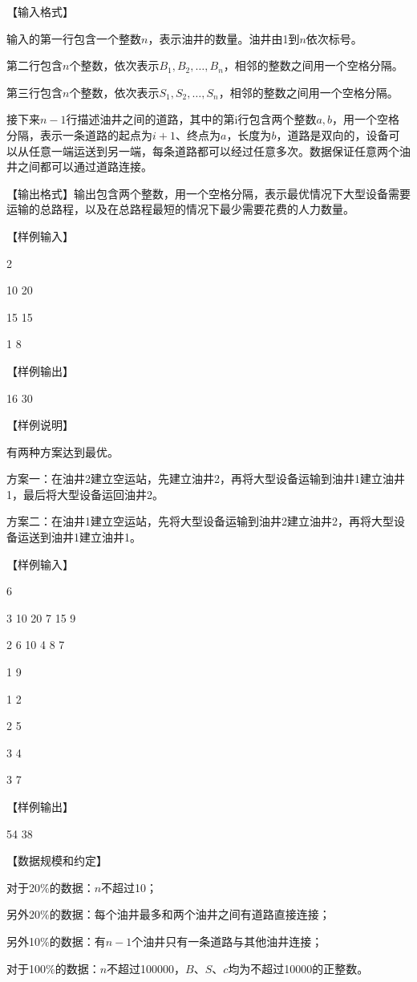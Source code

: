 \documentclass[a4paper, 12pt, twocolumn]{ctexart}
\begin{document}
	【输入格式】
	
	输入的第一行包含一个整数$n$，表示油井的数量。油井由1到$n$依次标号。
	
	第二行包含$n$个整数，依次表示$B_1, B_2, …, B_n$，相邻的整数之间用一个空格分隔。
	
	第三行包含$n$个整数，依次表示$S_1, S_2, …, S_n$，相邻的整数之间用一个空格分隔。
	
	接下来$n-1$行描述油井之间的道路，其中的第i行包含两个整数$a,b$，用一个空格分隔，表示一条道路的起点为$i+1$、终点为$a$，长度为$b$，道路是双向的，设备可以从任意一端运送到另一端，每条道路都可以经过任意多次。数据保证任意两个油井之间都可以通过道路连接。
	
	【输出格式】输出包含两个整数，用一个空格分隔，表示最优情况下大型设备需要运输的总路程，以及在总路程最短的情况下最少需要花费的人力数量。
	
	【样例输入】
	
	2
	
	10 20
	
	15 15
	
	1 8
	
	【样例输出】
	
	16 30
	
	
	【样例说明】
	
	有两种方案达到最优。
	
	方案一：在油井2建立空运站，先建立油井2，再将大型设备运输到油井1建立油井1，最后将大型设备运回油井2。
	
	方案二：在油井1建立空运站，先将大型设备运输到油井2建立油井2，再将大型设备运送到油井1建立油井1。
	
	【样例输入】
	
	6
	
	3 10 20 7 15 9
	
	2 6 10 4 8 7
	
	1 9
	
	1 2
	
	2 5
	
	3 4
	
	3 7
	
	
	【样例输出】
	
	54 38
	
	【数据规模和约定】
	
	对于20\%的数据：$n$不超过10；
	
	另外20\%的数据：每个油井最多和两个油井之间有道路直接连接；
	
	另外10\%的数据：有$n-1$个油井只有一条道路与其他油井连接；
	
	对于100\%的数据：$n$不超过100000，$B$、$S$、$c$均为不超过10000的正整数。
	
\end{document}
